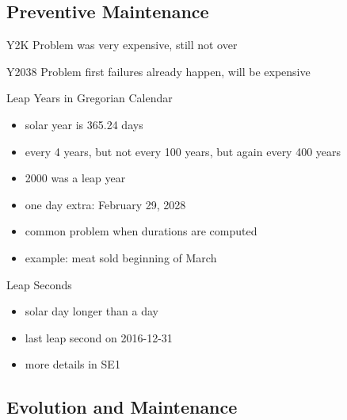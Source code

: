 \subsection{Preventive Maintenance}
\begin{frame}{\insertsubsection}
	\begin{fancycolumns}
		\begin{definition}{\insertsubsection\mysource{\lientzswanson}}
			 \hfill {}
		\end{definition}
		\begin{example}{Y2K Problem}
			was very expensive, still not over
		\end{example}
		\begin{example}{Y2038 Problem}
			first failures already happen, will be expensive
		\end{example}
	\nextcolumn
		\begin{example}{Leap Years in Gregorian Calendar}
			\begin{itemize}
				\item solar year is 365.24 days
				\item every 4 years, but not every 100 years, but again every 400 years
				\item 2000 was a leap year
				\item one day extra: February 29, 2028
				\item common problem when durations are computed
				\item example: meat sold beginning of March
			\end{itemize}
		\end{example}
		\begin{example}{Leap Seconds}
			\begin{itemize}
				\item solar day longer than a day
				\item last leap second on 2016-12-31
				\item more details in SE1
			\end{itemize}
			\centering{}
		\end{example}
	\end{fancycolumns}
\end{frame}

\subsection{Evolution and Maintenance}
\begin{frame}{\insertsubsection\ \mytitlesource{\ludewiglichter}}
	\slideEvolutionAndMaintenance
\end{frame}

